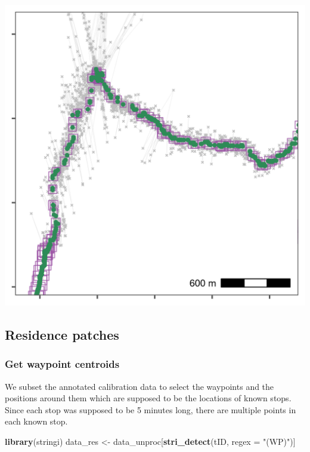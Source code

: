 \documentclass[
]{scrartcl}
\newenvironment{Shaded}{}{}
\newcommand{\DataTypeTok}[1]{\textcolor[rgb]{0.56,0.13,0.00}{#1}}
\newcommand{\KeywordTok}[1]{\textcolor[rgb]{0.00,0.44,0.13}{\textbf{#1}}}
\newcommand{\NormalTok}[1]{#1}
\newcommand{\StringTok}[1]{\textcolor[rgb]{0.25,0.44,0.63}{#1}}
\begin{document}
\includegraphics{figures/fig_calib_smooth_thin.png}

\hypertarget{residence-patches}{%
\subsection{Residence patches}\label{residence-patches}}

\hypertarget{get-waypoint-centroids}{%
\subsubsection{Get waypoint centroids}\label{get-waypoint-centroids}}

We subset the annotated calibration data to select the waypoints and the positions around them which are supposed to be the locations of known stops. Since each stop was supposed to be 5 minutes long, there are multiple points in each known stop.

\begin{Shaded}
\begin{Highlighting}[]
\KeywordTok{library}\NormalTok{(stringi)}
\NormalTok{data\_res <{-}}\StringTok{ }\NormalTok{data\_unproc[}\KeywordTok{stri\_detect}\NormalTok{(tID, }\DataTypeTok{regex =} \StringTok{"(WP)"}\NormalTok{)]}
\end{Highlighting}
\end{Shaded}
\end{document}
